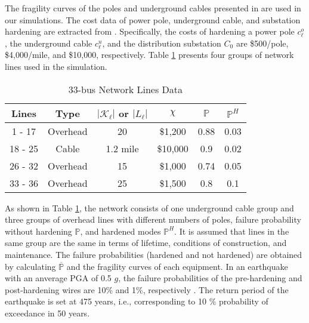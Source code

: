 \documentclass[conference]{IEEEtran}
\begin{document}
The fragility curves of the poles and underground cables presented in \cite{Xinzhenglu_fragilitycurves_2020} are used in our simulations. The cost data of power pole, underground cable, and substation hardening are extracted from \cite{Guidelines_electricityauthority_2018}. Specifically, the costs of hardening a power pole $c_\ell^o$, the underground cable $c_\ell^u$, and the distribution substation $C_0$ are \$500/pole, \$4,000/mile, and \$10,000, respectively.
Table \ref{line data} presents four groups of network lines used in the simulation. \begin{table}[!htb]
\centering
\caption{\label{line data} 33-bus Network Lines Data }
\begin{tabular}{c c c c c c}
\hline
    Lines & Type & $|\mathcal{K}_{\ell}|$ or $|L_{\ell}|$& $\chi$ & $\mathbb{P}$& $\mathbb{P}^H$ \\
\hline    
     1 - 17 & Overhead & 20 & \$1,200  & 0.88 & 0.03\\
     18 - 25 & Cable & 1.2 mile & \$10,000 & 0.9 & 0.02\\
     26 - 32 & Overhead & 15 & \$1,000 & 0.74 & 0.05\\
     33 - 36 & Overhead & 25 & \$1,500 & 0.8 & 0.1\\
     \hline
\end{tabular}
\end{table} As shown in Table \ref{line data}, the network consists of one underground cable group and three groups of overhead lines with different numbers of poles, failure probability without hardening $\mathbb{P}$, and hardened modes $\mathbb{P}^H$. It is assumed that lines in the same group are the same in terms of lifetime, conditions of construction, and maintenance. The failure probabilities (hardened and not hardened) are obtained by calculating ${\overline{\mathbb{P}}}$ and the fragility curves of each equipment. In an earthquake with an anverage PGA of 0.5 $g$, the failure probabilities of the pre-hardening and post-hardening wires are 10\% and 1\%, respectively \cite{Xinzhenglu_fragilitycurves_2020}. The return period of the earthquake is set at 475 years, i.e., corresponding to 10 \% probability of exceedance in 50 years.
\end{document}
